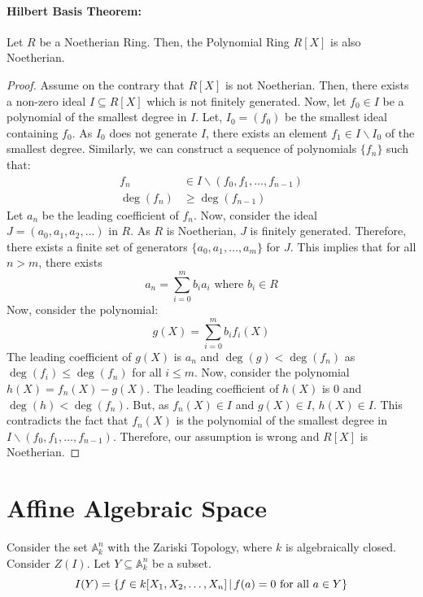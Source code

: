 \documentclass[12pt, oneside]{book}
\begin{document}
\paragraph{Hilbert Basis Theorem:} Let \(R\) be a Noetherian Ring.
Then, the Polynomial Ring \(R[X]\) is also Noetherian.
\begin{proof}
    Assume on the contrary that \(R[X]\) is not Noetherian.
    Then, there exists a non-zero ideal \(I \subseteq R[X]\) which is not finitely generated.
    Now, let \(f_0 \in I\) be a polynomial of the smallest degree in \(I\).
    Let, \(I_0 = (f_0)\) be the smallest ideal containing \(f_0\).
    As \(I_0\) does not generate \(I\), there exists an element \(f_1 \in I \smallsetminus I_0\) of the smallest degree.
    Similarly, we can construct a sequence of polynomials \(\{f_n\}\) such that:
    \begin{align*}
        f_n &\in I \smallsetminus (f_0, f_1, \dots, f_{n-1})\\
        \deg(f_n) &\geq \deg(f_{n-1})
    \end{align*}
    Let \(a_n\) be the leading coefficient of \(f_n\).
    Now, consider the ideal \(J = (a_0, a_1, a_2, \dots)\) in \(R\).
    As \(R\) is Noetherian, \(J\) is finitely generated.
    Therefore, there exists a finite set of generators \(\{a_0, a_1, \dots, a_m\}\) for \(J\).
    This implies that for all \(n > m\), there exists
    \[a_n = \sum_{i=0}^m b_i a_i \textrm{ where } b_i \in R\]
    Now, consider the polynomial:
    \[g(X) = \sum_{i=0}^m b_i f_i (X)\]
    The leading coefficient of \(g(X)\) is \(a_n\) and \(\deg(g) < \deg(f_n)\) as \(\deg(f_i) \leq \deg(f_n)\) for all \(i \leq m\).
    Now, consider the polynomial \(h(X) = f_n(X) - g(X)\).
    The leading coefficient of \(h(X)\) is \(0\) and \(\deg(h) < \deg(f_n)\).
    But, as \(f_n(X) \in I\) and \(g(X) \in I\), \(h(X) \in I\).
    This contradicts the fact that \(f_n(X)\) is the polynomial of the smallest degree in \(I \smallsetminus (f_0, f_1, \dots, f_{n-1})\).
    Therefore, our assumption is wrong and \(R[X]\) is Noetherian.
\end{proof}

\section{Affine Algebraic Space}
Consider the set \(\mathbb{A}_k^n\) with the Zariski Topology, where \(k\) is algebraically closed.
Consider \(Z(I)\). Let \(Y \subseteq \mathbb{A}_k^n\) be a subset.
\[I(Y) = \left\{f \in k[X_1, X_2,\dots, X_n] \; \vline \; f(a) = 0 \text{ for all } a \in Y \right\}\]
\end{document}
